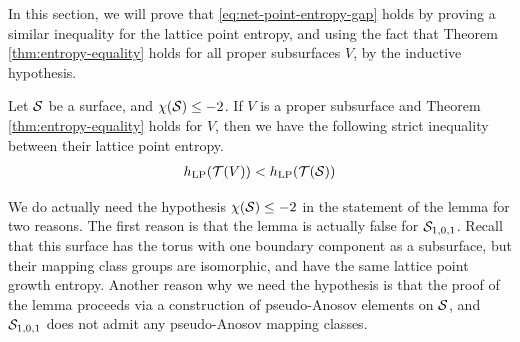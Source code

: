\documentclass[12pt, reqno]{amsart}
\begin{document}
In this section, we will prove that \eqref{eq:net-point-entropy-gap} holds by proving a similar inequality for the lattice point entropy, and using the fact that Theorem \ref{thm:entropy-equality} holds for all proper subsurfaces $V$, by the inductive hypothesis.

\begin{lemma}
  \label{lem:entropy-inequality}
  Let $\mathcal{S}$ be a surface, and $\chi(\mathcal{S}) \leq -2$. If $V$ is a proper subsurface and Theorem \ref{thm:entropy-equality} holds for $V$, then we have the following strict inequality between their lattice point entropy.
  \begin{align*}
    h_{\mathrm{LP}}(\mathcal{T}(V)) < h_{\mathrm{LP}}(\mathcal{T}(\mathcal{S}))
  \end{align*}
\end{lemma}

\begin{rem}
  We do actually need the hypothesis $\chi(\mathcal{S}) \leq -2$ in the statement of the lemma for two reasons.
  The first reason is that the lemma is actually false for $\mathcal{S}_{1,0,1}$.
  Recall that this surface has the torus with one boundary component as a subsurface, but their mapping class groups are isomorphic, and have the same lattice point growth entropy.
  Another reason why we need the hypothesis is that the proof of the lemma proceeds via a construction of pseudo-Anosov elements on $\mathcal{S}$, and $\mathcal{S}_{1,0,1}$ does not admit any pseudo-Anosov mapping classes.
\end{rem}
\end{document}
